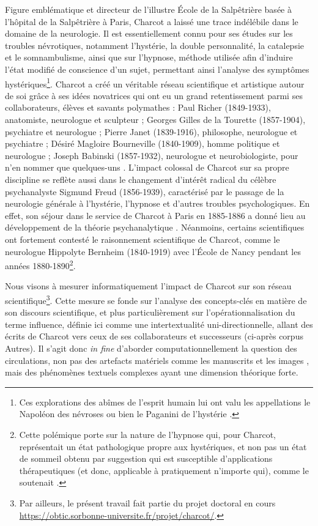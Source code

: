 Figure emblématique et directeur de l'illustre École de la Salpêtrière basée à l'hôpital de la Salpêtrière à Paris, Charcot a laissé une trace indélébile dans le domaine de la neurologie. Il est essentiellement
connu pour ses études sur les troubles névrotiques,
notamment l'hystérie, la double personnalité, la catalepsie et le somnambulisme, ainsi que sur l'hypnose, méthode utilisée afin d'induire l'état modifié de conscience d'un sujet, permettant ainsi l'analyse des symptômes hystériques\footnote{Ces explorations des abîmes de l'esprit humain lui ont valu les appellations \og{}le Napoléon des névroses\fg{} ou bien \og{}le Paganini de l'hystérie\fg{} \citep{marmion2015freud}.}. Charcot a créé un véritable réseau scientifique et artistique autour de soi grâce à ses idées novatrices qui ont eu un grand retentissement parmi ses collaborateurs, élèves et savants polymathes : Paul Richer (1849-1933), anatomiste, neurologue et sculpteur ; Georges Gilles de la Tourette (1857-1904), psychiatre et neurologue ; Pierre Janet (1839-1916), philosophe, neurologue et psychiatre ; Désiré Magloire Bourneville (1840-1909), homme politique et neurologue ; Joseph Babinski (1857-1932), neurologue et neurobiologiste, pour n'en nommer que quelques-uns \citep{bogousslavsky2014mysteries}. L'impact colossal de Charcot sur sa propre discipline se reflète aussi dans le changement d'intérêt radical du célèbre psychanalyste Sigmund Freud (1856-1939), caractérisé par le passage de la neurologie générale à l'hystérie, l'hypnose et d'autres troubles psychologiques. En effet, son séjour dans le service de Charcot à Paris en 1885-1886 a donné lieu au développement de la théorie psychanalytique \citep{camargo2018jean}. Néanmoins, certains scientifiques ont fortement contesté le raisonnement scientifique de Charcot, comme le neurologue Hippolyte Bernheim (1840-1919) avec l'École de Nancy pendant les années 1880-1890\footnote{Cette polémique porte sur la nature de l'hypnose qui, pour Charcot, représentait un état pathologique propre aux hystériques, et non pas un état de sommeil obtenu par suggestion qui est susceptible d'applications
thérapeutiques (et donc, applicable à pratiquement n'importe qui), comme le soutenait \cite{bernheim1891suggestion}.}.

Nous visons à mesurer informatiquement l'impact de Charcot sur son réseau scientifique\footnote{Par ailleurs, le présent travail fait partie du projet doctoral en cours \url{https://obtic.sorbonne-universite.fr/projet/charcot/}.}. Cette mesure se fonde sur l'analyse des concepts-clés en matière de son discours scientifique, et plus particulièrement sur l'opérationnalisation du terme \og{}influence\fg{}, définie ici comme une intertextualité uni-directionnelle, allant des écrits de Charcot vers ceux de ses collaborateurs et successeurs (ci-après corpus \og{}Autres\fg{}). Il s'agit donc \textit{in fine} d'aborder computationnellement la question des circulations, non pas des artefacts matériels comme les manuscrits \citep{gabay2021katabase} et les images \citep{joyeux2019visual}, mais des phénomènes textuels complexes \citep{manjavacas} ayant une dimension théorique forte.


